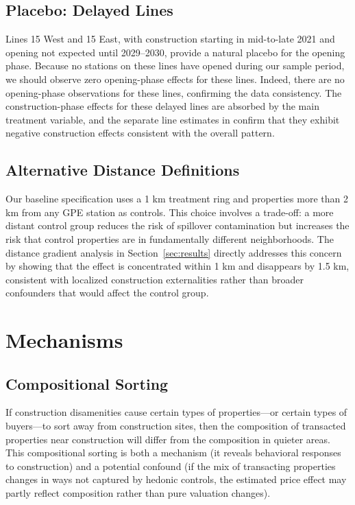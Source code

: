 \documentclass[12pt]{article}
\begin{document}
\subsection{Placebo: Delayed Lines}

Lines 15 West and 15 East, with construction starting in mid-to-late 2021 and opening not expected until 2029--2030, provide a natural placebo for the opening phase. Because no stations on these lines have opened during our sample period, we should observe zero opening-phase effects for these lines. Indeed, there are no opening-phase observations for these lines, confirming the data consistency. The construction-phase effects for these delayed lines are absorbed by the main treatment variable, and the separate line estimates in  confirm that they exhibit negative construction effects consistent with the overall pattern.

\subsection{Alternative Distance Definitions}

Our baseline specification uses a 1 km treatment ring and properties more than 2 km from any GPE station as controls. This choice involves a trade-off: a more distant control group reduces the risk of spillover contamination but increases the risk that control properties are in fundamentally different neighborhoods. The distance gradient analysis in Section~\ref{sec:results} directly addresses this concern by showing that the effect is concentrated within 1 km and disappears by 1.5 km, consistent with localized construction externalities rather than broader confounders that would affect the control group.


\section{Mechanisms}
\label{sec:mechanisms}

\subsection{Compositional Sorting}

If construction disamenities cause certain types of properties---or certain types of buyers---to sort away from construction sites, then the composition of transacted properties near construction will differ from the composition in quieter areas. This compositional sorting is both a mechanism (it reveals behavioral responses to construction) and a potential confound (if the mix of transacting properties changes in ways not captured by hedonic controls, the estimated price effect may partly reflect composition rather than pure valuation changes).
\end{document}
